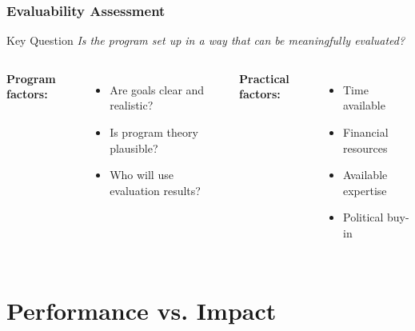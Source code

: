\documentclass{beamer}
\begin{document}
\begin{frame}
\frametitle{Evaluability Assessment}

{
\begin{block}{Key Question}
\textit{Is the program set up in a way that can be meaningfully evaluated?}
\end{block}}

\begin{columns}[t, totalwidth=\textwidth] %
\textbf{Program factors:}
\begin{itemize}[itemsep=0.3em, leftmargin=1.5em] %
    \item Are goals clear and realistic?
    \item Is program theory plausible?
    \item Who will use evaluation results?
\end{itemize}

\textbf{Practical factors:}
\begin{itemize}[itemsep=0.3em, leftmargin=1.5em] %
    \item Time available
    \item Financial resources
    \item Available expertise
    \item Political buy-in
\end{itemize}
\end{columns}

\vspace{0.5cm}
\end{frame}

\section{Performance vs. Impact}
\end{document}
